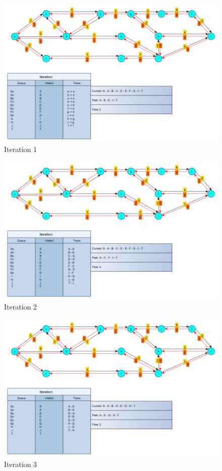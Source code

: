 \documentclass[10pt,a4paper]{article}
\begin{document}
\begin{enumerate}
	
\begin{figure}[H]
	\centering
	\includegraphics[width=0.9\linewidth]{img/fuckingFlowNetiter1}
	\caption{Iteration 1}
	\label{fig:fuckingflownetiter1}
\end{figure}

	
	
\begin{figure}[H]
	\centering
	\includegraphics[width=0.9\linewidth]{img/fuckingFlowNetiter2e}
	\caption{Iteration 2}
	\label{fig:fuckingflownetiter2e}
\end{figure}
	
	
	
\begin{figure}[H]
	\centering
	\includegraphics[width=0.9\linewidth]{img/fuckingFlowNetiter3}
	\caption{Iteration 3}
	\label{fig:fuckingflownetiter3}
\end{figure}
	

\end{enumerate}
\end{document}
